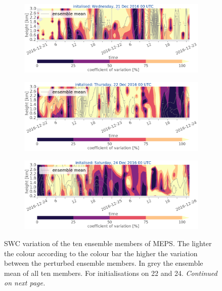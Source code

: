 \begin{figure}[t!]
	\centering
	\begin{subfigure}[b]{\textwidth}
		\includegraphics[trim={0cm 5cm 0cm 0cm},clip,width=\textwidth]{./fig_variation/20161221}
		\caption{}\label{fig:vari:EM21}
	\end{subfigure}
	\begin{subfigure}[b]{\textwidth}
		\includegraphics[trim={0cm 5cm 0cm 0cm},clip,width=\textwidth]{./fig_variation/20161222}
		\caption{}\label{fig:vari:EM22}
	\end{subfigure}
	\begin{subfigure}[b]{\textwidth}
		\includegraphics[trim={0cm 0cm 0cm 0cm},clip,width=\textwidth]{./fig_variation/20161224}
		\caption{}\label{fig:vari:EM24}
	\end{subfigure}
	\caption{SWC variation of the ten ensemble members of MEPS. The lighter the colour according to the colour bar the higher the variation between the perturbed ensemble members. In grey the ensemble mean of all ten members. For initialisations on \num{22} and \SI{24}{\dec}. \textit{Continued on next page.}}\label{fig:ens_vari}
\end{figure}
